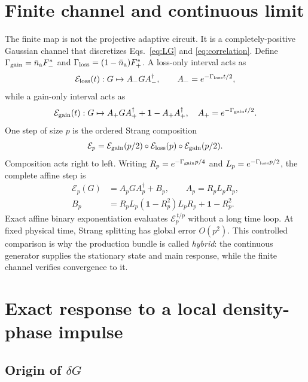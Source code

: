 \documentclass[aps,prb,twocolumn,nofootinbib,superscriptaddress,floatfix]{revtex4-2}
\newcommand{\id}{\mathbf{1}}
\begin{document}
\section{Finite channel and continuous limit}

The finite map is not the projective adaptive circuit. It is a
completely-positive Gaussian channel that discretizes
Eqs.~\eqref{eq:LG} and \eqref{eq:correlation}. Define
$\Gamma_{\rm gain}=\bar n_{\rm a}F_-^*$ and
$\Gamma_{\rm loss}=(1-\bar n_{\rm a})F_+^*$. A loss-only interval acts as
\begin{equation}
 \mathcal E_{\rm loss}(t):G\mapsto A_-GA_-^\dagger,\qquad
 A_-=e^{-\Gamma_{\rm loss}t/2},
\end{equation}
while a gain-only interval acts as
\begin{equation}
 \mathcal E_{\rm gain}(t):G\mapsto A_+GA_+^\dagger
 +\id-A_+A_+^\dagger,\quad A_+=e^{-\Gamma_{\rm gain}t/2}.
\end{equation}
One step of size $p$ is the ordered Strang composition
\begin{equation}
 \mathcal E_p=\mathcal E_{\rm gain}(p/2)\circ
 \mathcal E_{\rm loss}(p)\circ\mathcal E_{\rm gain}(p/2).
 \label{eq:strang}
\end{equation}
Composition acts right to left. Writing
$R_p=e^{-\Gamma_{\rm gain}p/4}$ and
$L_p=e^{-\Gamma_{\rm loss}p/2}$, the complete affine step is
\begin{align}
 \mathcal E_p(G)&=A_pGA_p^\dagger+B_p,\qquad A_p=R_pL_pR_p,\nonumber\\
 B_p&=R_pL_p(\id-R_p^2)L_pR_p+\id-R_p^2.
 \label{eq:affinestep}
\end{align}
Exact affine binary exponentiation evaluates $\mathcal E_p^{\,t/p}$ without a
long time loop. At fixed physical time, Strang splitting has global error
$O(p^2)$. This controlled comparison is why the production bundle is called
\emph{hybrid}: the continuous generator supplies the stationary state and
main response, while the finite channel verifies convergence to it.

\section{Exact response to a local density-phase impulse}

\subsection{Origin of \texorpdfstring{$\delta G$}{delta G}}
\end{document}

